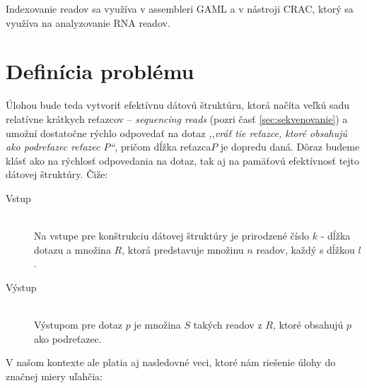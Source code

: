 Indexovanie readov sa využíva v assembleri GAML\cite{BBV14} a v nástroji CRAC\cite{PSCR13}, ktorý sa využíva na analyzovanie RNA readov.

\section{Definícia problému}
\label{sec:definicia_problemu}

Úlohou bude teda vytvoriť efektívnu dátovú štruktúru, ktorá načíta veľkú sadu
relatívne krátkych reťazcov -- \emph{sequencing reads} (pozri časť \ref{sec:sekvenovanie}) a umožní dostatočne rýchlo odpovedať na dotaz \emph{,,vráť tie
reťazce, ktoré obsahujú ako podreťazec reťazec $P$``}, pričom dĺžka reťazca$P$
je dopredu daná. Dôraz budeme klásť ako na rýchlosť odpovedania na dotaz, tak aj
na pamäťovú efektívnosť tejto dátovej štruktúry. Čiže:

\begin{description}
    \item[Vstup] \hfill \\
        Na vstupe pre konštrukciu dátovej štruktúry je prirodzené číslo $k$ -
        dĺžka dotazu a množina $R$, ktorá predstavuje množinu $n$ readov,
        každý s dĺžkou $l$.
    \item[Výstup] \hfill \\
        Výstupom pre dotaz $p$ je množina $S$ takých readov z $R$, ktoré
        obsahujú $p$ ako podreťazec.
\end{description}

V našom kontexte ale platia aj nasledovné veci, ktoré nám riešenie úlohy do
značnej miery uľahčia:

